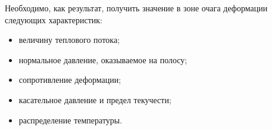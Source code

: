 Необходимо, как результат, получить значение в зоне очага деформации следующих характеристик:
\begin{itemize}
\item величину теплового потока;
\item нормальное давление, оказываемое на полосу;
\item сопротивление деформации;
\item касательное давление и предел текучести;
\item распределение температуры.
\end{itemize}

\newpage